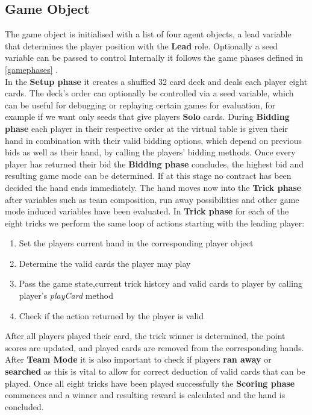 \subsection{Game Object}
The game object is initialised with a list of four agent objects, a lead variable that determines the player position
with the \textbf{Lead} role.
Optionally a seed variable can be passed to control
Internally it follows the game phases defined in \ref{gamephases} .\\
In the\textbf{ Setup phase} it creates a shuffled 32 card deck and deals each player eight cards.
The deck's order can optionally be controlled via a seed variable, which can be useful for debugging or replaying
certain games for evaluation, for example if we want only seeds that give players \textbf{Solo} cards.
\newline
During \textbf{Bidding phase} each player in their respective order at the virtual table is given their hand in
combination with their valid bidding options, which depend on previous bids as well as their hand, by calling the
players' bidding methods.
Once every player has returned their bid the \textbf{Bidding phase} concludes, the highest bid and resulting game
mode can be
determined.
If at this stage no contract has been decided the hand ends immediately.
The hand moves now into the \textbf{Trick phase} after variables such as team composition, run away possibilities and
other game mode induced variables have been evaluated.
\newline
In \textbf{Trick phase} for each of the eight tricks we perform the same loop of actions starting with the leading
player:
\begin{enumerate}
    \item Set the players current hand in the corresponding player object
    \item Determine the valid cards the player may play
    \item Pass the game state,current trick history and valid cards to player by calling player's \textit{playCard}
    method
    \item Check if the action returned by the player is valid
\end{enumerate}
After all players played their card, the trick winner is determined, the point scores are updated, and played cards
are removed from the corresponding hands.
After \textbf{Team Mode} it is also important to check if players \textbf{ran away} or \textbf{searched} as this is
vital to allow for correct deduction of valid cards that can be played.
\newline
Once all eight tricks have been played successfully the \textbf{Scoring phase} commences and a winner and resulting
reward is calculated and the hand is concluded.
